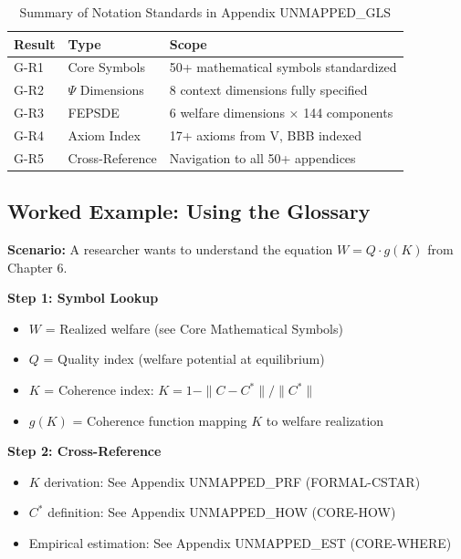 \begin{table}[htbp]
\centering
\caption{Summary of Notation Standards in Appendix UNMAPPED_GLS}
\label{tab:g-results}
\renewcommand{\arraystretch}{1.2}
\begin{tabular}{@{}llp{6cm}@{}}
\toprule
\textbf{Result} & \textbf{Type} & \textbf{Scope} \\
\midrule
G-R1 & Core Symbols & 50+ mathematical symbols standardized \\
G-R2 & $\Psi$ Dimensions & 8 context dimensions fully specified \\
G-R3 & FEPSDE & 6 welfare dimensions × 144 components \\
G-R4 & Axiom Index & 17+ axioms from V, BBB indexed \\
G-R5 & Cross-Reference & Navigation to all 50+ appendices \\
\bottomrule
\end{tabular}
\end{table}


\subsection{Worked Example: Using the Glossary}
\label{sec:glossary-example}

\textbf{Scenario:} A researcher wants to understand the equation $W = Q \cdot g(K)$ from Chapter 6.

\textbf{Step 1: Symbol Lookup}
\begin{itemize}[nosep]
    \item $W$ = Realized welfare (see Core Mathematical Symbols)
    \item $Q$ = Quality index (welfare potential at equilibrium)
    \item $K$ = Coherence index: $K = 1 - \|C - C^*\|/\|C^*\|$
    \item $g(K)$ = Coherence function mapping $K$ to welfare realization
\end{itemize}

\textbf{Step 2: Cross-Reference}
\begin{itemize}[nosep]
    \item $K$ derivation: See Appendix UNMAPPED_PRF (FORMAL-CSTAR)
    \item $C^*$ definition: See Appendix UNMAPPED_HOW (CORE-HOW)
    \item Empirical estimation: See Appendix UNMAPPED_EST (CORE-WHERE)
\end{itemize}

